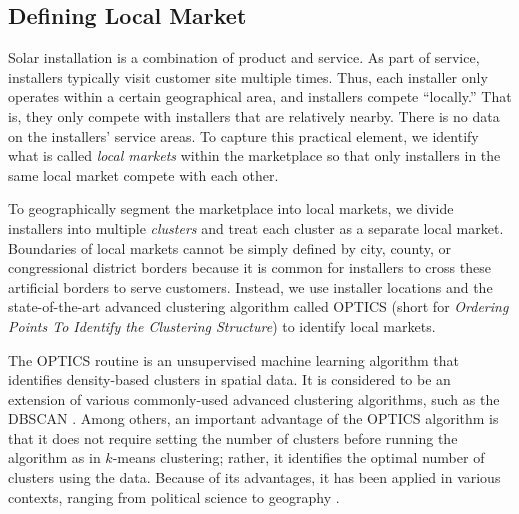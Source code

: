 \documentclass[msom,blindrev]{informs3}
\begin{document}
\subsection{Defining Local Market}
\label{defining_local_market}


Solar installation is a combination of product and service. As part of service, installers typically visit customer site multiple times. Thus, each installer only operates  within a certain geographical area, and installers compete ``locally.'' That is, they only compete with installers that are relatively nearby. There is no data on the installers' service areas. To capture this practical element, we identify what is called \emph{local markets} within the marketplace so that only installers in the same local market compete with each other.

To geographically segment the marketplace into local markets, we divide installers into multiple \emph{clusters} and treat each cluster as a separate local market. Boundaries of local markets cannot be simply defined by city, county, or congressional district borders because it is common for installers to cross these artificial borders to serve customers. Instead, we use installer locations and the state-of-the-art advanced clustering algorithm called OPTICS (short for \textit{Ordering Points To Identify the Clustering Structure}) to identify local markets.

The OPTICS routine is an unsupervised machine learning algorithm that identifies density-based clusters in spatial data. It is considered to be an extension of various commonly-used advanced clustering algorithms, such as the DBSCAN \citep{kanagala2016comparative}. Among others, an important advantage of the OPTICS algorithm is that it does not require setting the number of clusters before running the algorithm as in $k$-means clustering; rather, it identifies the optimal number of clusters using the data. Because of its advantages, it has been applied in various contexts, ranging from political science \citep{davidson2019neighborhood} to geography \citep{teimouri2016method}.

\end{document}
